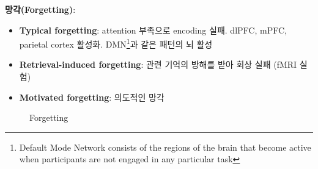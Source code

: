 \documentclass{beamer}
\begin{document}
\begin{frame}
  \textbf{망각(Forgetting)}:
  \begin{minipage}{0.5\textwidth}
    \begin{itemize}
      \small
      \item \textbf{Typical forgetting}: attention 부족으로 encoding 실패. dlPFC, mPFC, parietal cortex 활성화. DMN\footnote{Default Mode Network consists of the regions of the brain that
become active when participants are not engaged in any particular task}과 같은 패턴의 뇌 활성
      \item \textbf{Retrieval-induced forgetting}: 관련 기억의 방해를 받아 회상 실패 (fMRI 실험)
      \item \textbf{Motivated forgetting}: 의도적인 망각
    \end{itemize}
    \hfill
  \end{minipage}%
  \begin{minipage}{0.5\textwidth}
    \vspace{-2em}
    \begin{figure}
      \centering
      \qquad
      \vspace{-0.5em}
      \caption{Forgetting}

    \end{figure}
  \end{minipage}
  
\end{frame}
\end{document}
